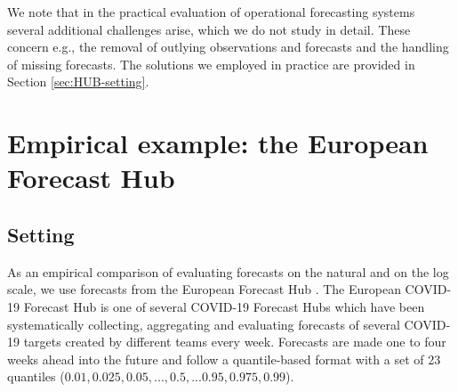\documentclass[10pt,letterpaper]{article}
\begin{document}
We note that in the practical evaluation of operational forecasting systems  several additional challenges arise, which we do not study in detail. These concern e.g., the removal of outlying observations and forecasts and the handling of missing forecasts. The solutions we employed in practice are provided in Section \ref{sec:HUB-setting}.

\section*{Empirical example: the European Forecast Hub}
\label{sec:HUB}

\subsection*{Setting}
\label{sec:HUB-setting}

As an empirical comparison of evaluating forecasts on the natural and on the log scale, we use forecasts from the European Forecast Hub \cite{europeancovid-19forecasthubEuropeanCovid19Forecast2021, sherrattPredictivePerformanceMultimodel2022}. 
The European COVID-19 Forecast Hub is one of several COVID-19 Forecast Hubs \cite{cramerEvaluationIndividualEnsemble2021, bracherShorttermForecastingCOVID192021} which have been systematically collecting, aggregating and evaluating forecasts of several COVID-19 targets created by different teams every week. Forecasts are made one to four weeks ahead into the future and follow a quantile-based format with a set of 23 quantiles ($0.01, 0.025, 0.05, ..., 0.5, ... 0.95, 0.975, 0.99$). 
\end{document}
